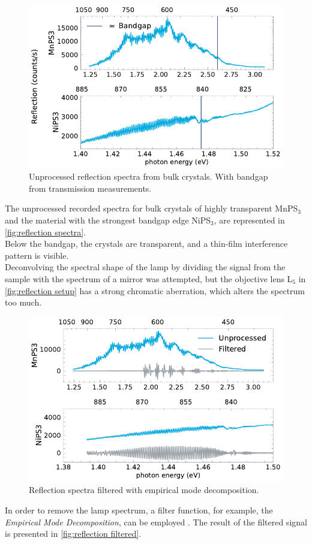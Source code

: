 \documentclass[
	twoside,
	parskip=half,
	a4paper,
]{scrbook}
\begin{document}
\begin{figure}
	\centering
	\includegraphics{../figures/2024-03-14 reflection spectra.pdf}
	\caption{Unprocessed reflection spectra from bulk crystals. With bandgap from transmission measurements.}
	\label{fig:reflection spectra}
\end{figure}
The unprocessed recorded spectra for bulk crystals of highly transparent MnPS$_3$ and the material with the strongest bandgap edge NiPS$_3$, are represented in \autoref{fig:reflection spectra}.\\
Below the bandgap, the crystals are transparent, and a thin-film interference pattern is visible.\\
Deconvolving the spectral shape of the lamp by dividing the signal from the sample with the spectrum of a mirror was attempted, but the objective lens L$_5$ in \autoref{fig:reflection setup} has a strong chromatic aberration, which alters the spectrum too much.

\begin{figure}
	\centering
	\includegraphics{../figures/2024-03-14 reflection spectra IMF.pdf}
	\caption{Reflection spectra filtered with empirical mode decomposition.}
	\label{fig:reflection filtered}
\end{figure}
In order to remove the lamp spectrum, a filter function, for example, the \textit{Empirical Mode Decomposition}, can be employed \cite{thickness}.
The result of the filtered signal is presented in \autoref{fig:reflection filtered}.
\end{document}
